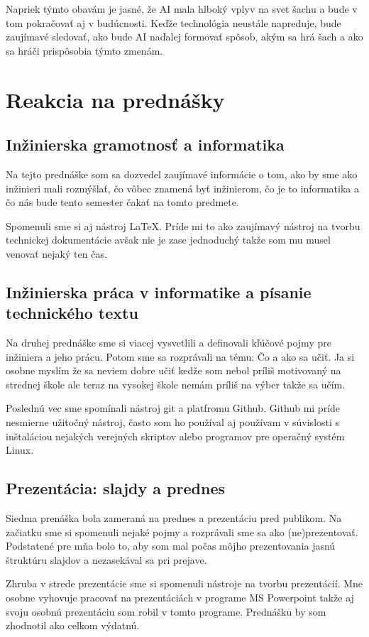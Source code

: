 \documentclass[10pt,oneside,slovak,a4paper]{article}
\begin{document}
Napriek týmto obavám je jasné, že AI mala hlboký vplyv na svet šachu a bude v tom pokračovať aj v budúcnosti. Keďže technológia neustále napreduje, bude zaujímavé sledovať, ako bude AI naďalej formovať spôsob, akým sa hrá šach a ako sa hráči prispôsobia týmto zmenám.

\section{Reakcia na prednášky}
\subsection{Inžinierska gramotnosť a informatika}

Na tejto prednáške som sa dozvedel zaujímavé informácie o tom, ako by sme ako inžinieri mali rozmýšlať, čo vôbec znamená byť inžinierom, čo je to informatika a čo nás bude tento semester čakať na tomto predmete.

Spomenuli sme si aj nástroj LaTeX. Príde mi to ako zaujímavý nástroj na tvorbu technickej dokumentácie avšak nie je zase jednoduchý takže som mu musel venovať nejaký ten čas.


\subsection{Inžinierska práca v informatike a písanie technického textu}

Na druhej prednáške sme si viacej vysvetlili a definovali kľúčové pojmy pre inžiniera a jeho prácu. Potom sme sa rozprávali na tému: Čo a ako sa učiť. Ja si osobne myslím že sa neviem dobre učiť kedže som nebol príliš motivovaný na strednej škole ale teraz na vysokej škole nemám príliš na výber takže sa učím.

Poslednú vec sme spomínali nástroj git a platfromu Github. Github mi príde nesmierne užitočný nástroj, často som ho používal aj používam v súvislosti s inštaláciou nejakých verejných skriptov alebo programov pre operačný systém Linux.

\subsection{Prezentácia: slajdy a prednes}

Siedma prenáška bola zameraná na prednes a prezentáciu pred publikom. Na začiatku sme si spomenuli nejaké pojmy a rozprávali sme sa ako (ne)prezentovať. Podstatené pre mňa bolo to, aby som mal počas môjho prezentovania jasnú štruktúru slajdov a nezasekával sa pri prejave.

Zhruba v strede prezentácie sme si spomenuli  nástroje na tvorbu prezentácií. Mne osobne vyhovuje pracovať na prezentáciách v programe MS Powerpoint takže aj svoju osobnú prezentáciu som robil v tomto programe. Prednášku by som zhodnotil ako celkom výdatnú.



\end{document}
